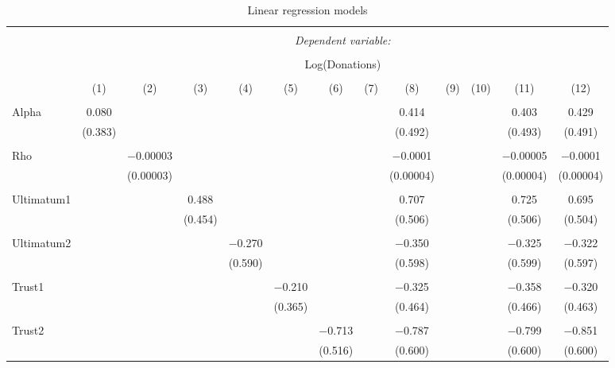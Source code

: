 \begin{table}[H] \centering 
  \caption{Linear regression models} 
  \label{} 
   \begin{adjustbox}{width=\textwidth}
\begin{tabular}{@{\extracolsep{5pt}}lcccccccccccc} 
\\[-1.8ex]\hline 
\hline \\[-1.8ex] 
 & \multicolumn{12}{c}{\textit{Dependent variable:}} \\ 
\cline{2-13} 
\\[-1.8ex] & \multicolumn{12}{c}{Log(Donations)} \\ 
\\[-1.8ex] & (1) & (2) & (3) & (4) & (5) & (6) & (7) & (8) & (9) & (10) & (11) & (12)\\ 
\hline \\[-1.8ex] 
 Alpha & 0.080 &  &  &  &  &  &  & 0.414 &  &  & 0.403 & 0.429 \\ 
  & (0.383) &  &  &  &  &  &  & (0.492) &  &  & (0.493) & (0.491) \\ 
  & & & & & & & & & & & & \\ 
 Rho &  & $-$0.00003 &  &  &  &  &  & $-$0.0001 &  &  & $-$0.00005 & $-$0.0001 \\ 
  &  & (0.00003) &  &  &  &  &  & (0.00004) &  &  & (0.00004) & (0.00004) \\ 
  & & & & & & & & & & & & \\ 
 Ultimatum1 &  &  & 0.488 &  &  &  &  & 0.707 &  &  & 0.725 & 0.695 \\ 
  &  &  & (0.454) &  &  &  &  & (0.506) &  &  & (0.506) & (0.504) \\ 
  & & & & & & & & & & & & \\ 
 Ultimatum2 &  &  &  & $-$0.270 &  &  &  & $-$0.350 &  &  & $-$0.325 & $-$0.322 \\ 
  &  &  &  & (0.590) &  &  &  & (0.598) &  &  & (0.599) & (0.597) \\ 
  & & & & & & & & & & & & \\ 
 Trust1 &  &  &  &  & $-$0.210 &  &  & $-$0.325 &  &  & $-$0.358 & $-$0.320 \\ 
  &  &  &  &  & (0.365) &  &  & (0.464) &  &  & (0.466) & (0.463) \\ 
  & & & & & & & & & & & & \\ 
 Trust2 &  &  &  &  &  & $-$0.713 &  & $-$0.787 &  &  & $-$0.799 & $-$0.851 \\ 
  &  &  &  &  &  & (0.516) &  & (0.600) &  &  & (0.600) & (0.600) \\ 

\end{tabular}
\end{adjustbox}
\end{table}
